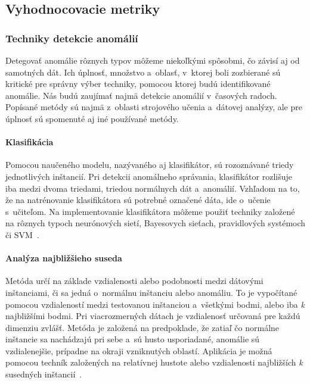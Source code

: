\documentclass[a4paper,twoside,slovak,12pt]{article}
\begin{document}

\subsection{Vyhodnocovacie metriky}


\subsubsection{Techniky detekcie anomálií}
Detegovať anomálie rôznych typov môžeme niekoľkými spôsobmi, čo závisí aj od
samotných dát. Ich úplnosť, množstvo a~oblasť, v~ktorej boli zozbierané sú
kritické pre správny výber techniky, pomocou ktorej budú identifikované anomálie.
Nás budú zaujímať najmä detekcie anomálií v~časových radoch. Popísané metódy
sú najmä z~oblasti strojového učenia a~dátovej analýzy, ale pre úplnosť sú
spomenuté aj iné používané metódy.

\paragraph{Klasifikácia}
Pomocou naučeného modelu, nazývaného aj klasifikátor, sú rozoznávané triedy
jednotlivých inštancií. Pri detekcii anomálneho správania, klasifikátor rozlišuje
iba medzi dvoma triedami, triedou normálnych dát a~anomálií. Vzhľadom na to, že
na natrénovanie klasifikátora sú potrebné označené dáta, ide o~učenie s~učiteľom.
Na implementovanie klasifikátora môžeme použiť techniky založené na rôznych
typoch neurónových sietí, Bayesovych sieťach, pravidlových systémoch či
SVM~\cite{Chandola2009,Tan2005}.

\paragraph{Analýza najbližšieho suseda}
Metóda určí na základe vzdialenosti alebo podobnosti medzi dátovými inštanciami,
či sa jedná o~normálnu inštanciu alebo anomáliu. To je vypočítané pomocou
vzdialeností medzi testovanou inštanciou a~všetkými bodmi, alebo iba \textit{k}
najbližšími bodmi. Pri viacrozmerných dátach je vzdialenosť určovaná pre
každú dimenziu zvlášť. Metóda je založená na predpoklade, že zatiaľ čo normálne
inštancie sa nachádzajú pri sebe a~sú husto usporiadané, anomálie sú vzdialenejšie,
prípadne na okraji vzniknutých oblastí. Aplikácia je možná pomocou techník založených
na relatívnej hustote alebo vzdialenosti najbližších \textit{k} susedných
inštancií~\cite{Chandola2009,Tan2005}.
\end{document}

